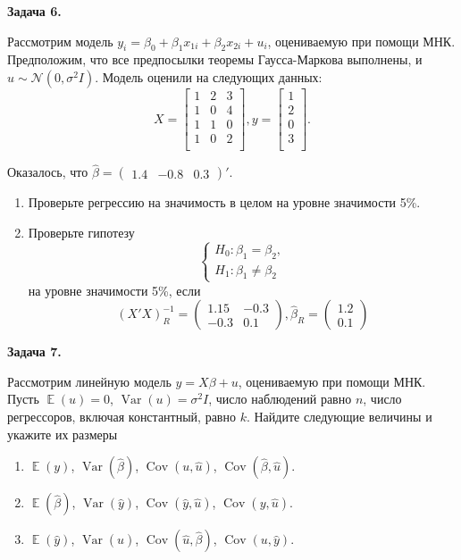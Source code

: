 \documentclass[10pt, a4paper]{extarticle}
\DeclareMathOperator{\cov}{Cov}
\DeclareMathOperator{\Var}{Var}
\DeclareMathOperator{\E}{\mathbb{E}}
\begin{document}
	{\Large \textbf{Задача 6.}}
	
	Рассмотрим модель $y_i = \beta_0 + \beta_1x_{1i} + \beta_2x_{2i} + u_i$, оцениваемую при помощи МНК. Предположим, что все предпосылки теоремы Гаусса-Маркова выполнены, и $u \sim \mathcal{N}(0, \sigma^2I)$. Модель оценили на следующих данных:
	\[
	X = \begin{bmatrix}
		1 & 2 & 3 \\
		1 & 0 & 4 \\
		1 & 1 & 0 \\
		1 & 0 & 2 \\
	\end{bmatrix},
	y = \begin{bmatrix}
		1 \\
		2 \\
		0 \\
		3 \\
	\end{bmatrix}.
	\]
	
	Оказалось, что $\hat{\beta} = \begin{pmatrix}
		1.4 & -0.8 & 0.3
	\end{pmatrix}'$.
	
	\begin{enumerate}[label=\alph*)]
		\item Проверьте регрессию на значимость в целом на уровне значимости 5\%.
		\item Проверьте гипотезу
		\[
		\begin{cases}
			H_0: \beta_1 = \beta_2, \\
			H_1: \beta_1 \ne \beta_2
		\end{cases}
		\]
		на уровне значимости 5\%, если 
		\[
		(X'X)^{-1}_R = \begin{pmatrix}
			1.15 & -0.3 \\
			-0.3 & 0.1
		\end{pmatrix},
		\hat{\beta}_R = \begin{pmatrix}
		1.2 \\
		0.1
		\end{pmatrix}
		\]
	\end{enumerate}
	\vspace{1em}
	
	{\Large \textbf{Задача 7.}}
	
	Рассмотрим линейную модель $y = X\beta + u$, оцениваемую при помощи МНК. Пусть $\E(u) = 0$, $\Var(u) = \sigma^2 I$, число наблюдений равно $n$, число регрессоров, включая константный, равно $k$. Найдите следующие величины и укажите их размеры
	\begin{enumerate}[label=\alph*)]
		\item $\E(y)$, $\Var(\hat{\beta})$, $\cov(u, \hat{u})$, $\cov(\hat{\beta}, \hat{u})$.
		\item $\E(\hat{\beta})$, $\Var(\hat{y})$, $\cov(\hat{y}, \hat{u})$, $\cov(y, \hat{u})$.
		\item $\E(\hat{y})$, $\Var(\hat{u})$, $\cov(\hat{u}, \hat{\beta})$, $\cov(u, \hat{y})$.
	\end{enumerate}
	\vspace{1em}
\end{document}
